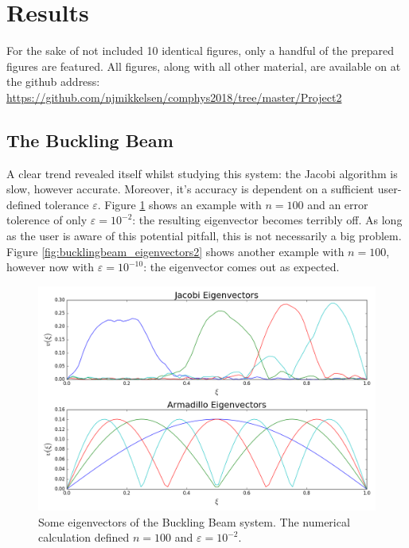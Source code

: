 \documentclass[reprint,english]{revtex4-1}
\begin{document}
\section{Results}
For the sake of not included 10 identical figures, only a handful of the prepared figures are featured. All figures, along with all other material, are available on at the github address:\\
{\scriptsize\url{https://github.com/njmikkelsen/comphys2018/tree/master/Project2}}
\subsection{The Buckling Beam}
A clear trend revealed itself whilst studying this system: the Jacobi algorithm is slow, however accurate. Moreover, it's accuracy is dependent on a sufficient user-defined tolerance \(\varepsilon\). Figure \ref{fig:bucklingbeam_eigenvectors1} shows an example with \(n=100\) and an error tolerence of only \(\varepsilon=10^{-2}\): the resulting eigenvector becomes terribly off. As long as the user is aware of this potential pitfall, this is not necessarily a big problem. Figure \ref{fig:bucklingbeam_eigenvectors2} shows another example with \(n=100\), however now with \(\varepsilon=10^{-10}\): the eigenvector comes out as expected.
\begin{figure}[h]
\centering
\includegraphics[scale=0.275]{BucklingBeam/plots/vector100_2.png}
\caption{Some eigenvectors of the Buckling Beam system. The numerical calculation defined \(n=100\) and \(\varepsilon=10^{-2}\).}
\label{fig:bucklingbeam_eigenvectors1}
\end{figure}
\end{document}
